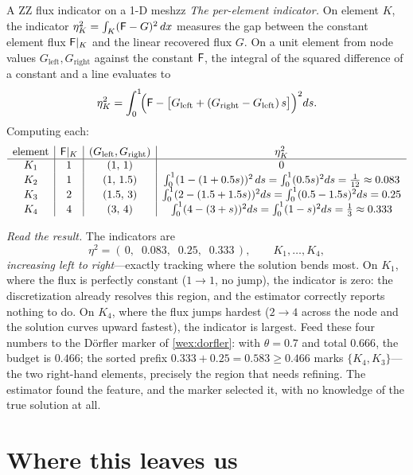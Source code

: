 \begin{workedexample}{A ZZ flux indicator on a 1-D mesh}{zz}
\emph{The per-element indicator.} On element $K$, the indicator
$\eta_K^2 = \int_K (\mathsf{F} - G)^2\,dx$ measures the gap between the constant element
flux $\mathsf{F}|_K$ and the linear recovered flux $G$. On a unit element from node values
$G_{\text{left}}, G_{\text{right}}$ against the constant $\mathsf{F}$, the integral of the
squared difference of a constant and a line evaluates to
\[
\eta_K^2 = \int_0^1\!\Bigl(\mathsf{F} - \bigl[G_{\text{left}} + (G_{\text{right}}-G_{\text{left}})\,s\bigr]\Bigr)^2 ds .
\]
Computing each:
\[
\begin{array}{c|c|c|c}
\text{element} & \mathsf{F}|_K & (G_{\text{left}},G_{\text{right}}) & \eta_K^2 \\\hline
K_1 & 1 & (1,\,1)   & 0 \\
K_2 & 1 & (1,\,1.5) & \int_0^1(1-(1+0.5s))^2\,ds = \int_0^1 (0.5s)^2 ds = \tfrac{1}{12}\approx 0.083 \\
K_3 & 2 & (1.5,\,3) & \int_0^1(2-(1.5+1.5s))^2 ds = \int_0^1 (0.5-1.5s)^2 ds = 0.25 \\
K_4 & 4 & (3,\,4)   & \int_0^1(4-(3+s))^2 ds = \int_0^1 (1-s)^2 ds = \tfrac{1}{3}\approx 0.333 \\
\end{array}
\]

\emph{Read the result.} The indicators are
\[
\eta^2 = (\,0,\;\;0.083,\;\;0.25,\;\;0.333\,),
\qquad K_1,\dots,K_4,
\]
\emph{increasing left to right}---exactly tracking where the solution bends most. On
$K_1$, where the flux is perfectly constant ($1\!\to\!1$, no jump), the indicator is
zero: the discretization already resolves this region, and the estimator correctly
reports nothing to do. On $K_4$, where the flux jumps hardest ($2\!\to\!4$ across the
node and the solution curves upward fastest), the indicator is largest. Feed these
four numbers to the D\"orfler marker of \cref{wex:dorfler}: with $\theta = 0.7$ and
total $0.666$, the budget is $0.466$; the sorted prefix $0.333 + 0.25 = 0.583 \ge
0.466$ marks $\{K_4, K_3\}$---the two right-hand elements, precisely the region that
needs refining. The estimator found the feature, and the marker selected it, with no
knowledge of the true solution at all.
\end{workedexample}

\section{Where this leaves us}

